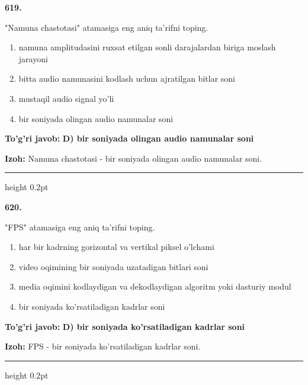 \documentclass[10pt,a4paper,oneside]{article}
\begin{document}
\noindent\textbf{\color{ink}619.}
\par
"Namuna chastotasi" atamasiga eng aniq ta'rifni toping.
\begin{enumerate}[label=\Alph*),leftmargin=9mm]
\item namuna amplitudasini ruxsat etilgan sonli darajalardan biriga moslash jarayoni
\item bitta audio namunasini kodlash uchun ajratilgan bitlar soni
\item mustaqil audio signal yo'li
\item bir soniyada olingan audio namunalar soni
\end{enumerate}
\begin{tcolorbox}[enhanced,breakable,colback=teal!4,colframe=teal!50!black,boxrule=0.5pt,arc=1.1mm,left=3mm,right=3mm,top=1.7mm,bottom=1.7mm,before skip=2mm,after skip=2mm]
\textbf{\color{teal}To'g'ri javob:} \textbf{D) bir soniyada olingan audio namunalar soni}
\par\smallskip
\textbf{Izoh:} Namuna chastotasi - bir soniyada olingan audio namunalar soni.
\end{tcolorbox}
\vspace{2mm}\hrule height 0.2pt \vspace{3mm}

\noindent\textbf{\color{ink}620.}
\par
"FPS" atamasiga eng aniq ta'rifni toping.
\begin{enumerate}[label=\Alph*),leftmargin=9mm]
\item har bir kadrning gorizontal va vertikal piksel o'lchami
\item video oqimining bir soniyada uzatadigan bitlari soni
\item media oqimini kodlaydigan va dekodlaydigan algoritm yoki dasturiy modul
\item bir soniyada ko'rsatiladigan kadrlar soni
\end{enumerate}
\begin{tcolorbox}[enhanced,breakable,colback=teal!4,colframe=teal!50!black,boxrule=0.5pt,arc=1.1mm,left=3mm,right=3mm,top=1.7mm,bottom=1.7mm,before skip=2mm,after skip=2mm]
\textbf{\color{teal}To'g'ri javob:} \textbf{D) bir soniyada ko'rsatiladigan kadrlar soni}
\par\smallskip
\textbf{Izoh:} FPS - bir soniyada ko'rsatiladigan kadrlar soni.
\end{tcolorbox}
\vspace{2mm}\hrule height 0.2pt \vspace{3mm}
\end{document}
